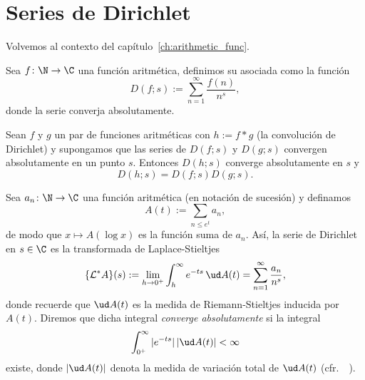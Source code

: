 \documentclass[teoria-numeros.tex]{subfiles}
\begin{document}
\section{Series de Dirichlet}
Volvemos al contexto del capítulo~\ref{ch:arithmetic_func}.
\begin{mydef}
	Sea $f \colon \N \to \C$ una función aritmética, definimos su  asociada como la función
	\[
		D(f; s) := \sum_{n=1}^{\infty} \frac{f(n)}{n^s},
	\]
	donde la serie converja absolutamente.
\end{mydef}
\begin{prop}
	Sean $f$ y $g$ un par de funciones aritméticas con $h := f * g$ (la convolución de Dirichlet)
	y supongamos que las series de $D(f; s)$ y $D(g; s)$ convergen absolutamente en un punto $s$.
	Entonces $D(h; s)$ converge absolutamente en $s$ y
	\[
		D(h; s) = D(f; s)D(g; s).
	\]
\end{prop}

Sea $a_n \colon \N \to \C$ una función aritmética (en notación de sucesión) y definamos
\[
	A(t) := \sum_{n \le e^t} a_n,
\]
de modo que $x \mapsto A(\log x)$ es la función suma de $a_n$.
Así, la serie de Dirichlet en $s \in \C$ es la transformada de Laplace-Stieltjes
\[
	\{ \mathcal{L}^* A \}(s) := \lim_{h \to 0^+} \int_{h}^{\infty} e^{-ts} \, \ud A(t) = \sum_{n=1}^{\infty} \frac{a_n}{n^s},
\]
donde recuerde que $\ud A(t)$ es la medida de Riemann-Stieltjes inducida por $A(t)$.
Diremos que dicha integral \emph{converge absolutamente} si la integral
\[
	\int_{0^+}^{\infty} |e^{-ts}| \, |\ud A(t)| < \infty
\]
existe, donde $|\ud A(t)|$ denota la medida de variación total de $\ud A(t)$
(cfr.\ \citeauthor{lang:analysis}~\cite[196\psq]{lang:analysis}).
\end{document}
